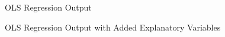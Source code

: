 OLS Regression Output
\begin{stlog}\end{stlog}
OLS Regression Output with Added Explanatory Variables
\begin{stlog}\end{stlog}
